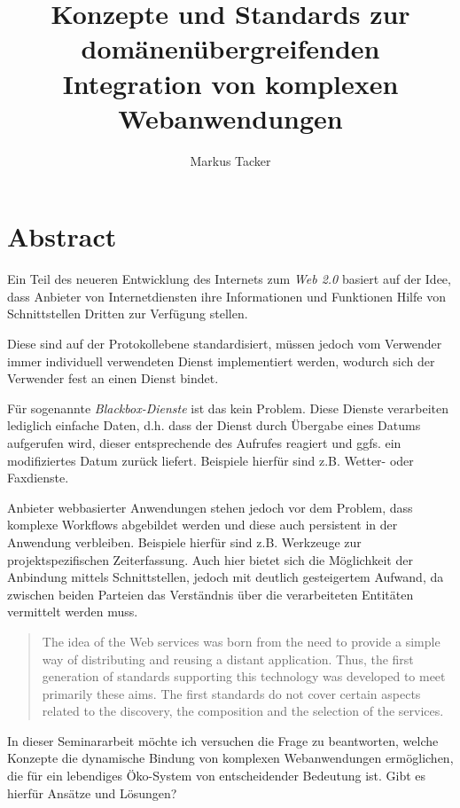 \documentclass[12pt,a4paper]{article}
\begin{document}
\author{Markus Tacker}
\title{Konzepte und Standards zur domänenübergreifenden Integration von komplexen Webanwendungen}
\maketitle
\section*{Abstract}
Ein Teil des neueren Entwicklung des Internets zum \emph{Web 2.0} basiert auf der Idee, dass Anbieter von Internetdiensten ihre Informationen und Funktionen Hilfe von Schnittstellen Dritten zur Verfügung stellen.\cite{baresitalk2007}

Diese sind auf der Protokollebene standardisiert, müssen jedoch vom Verwender immer individuell verwendeten Dienst implementiert werden, wodurch sich der Verwender fest an einen Dienst bindet.

Für sogenannte \emph{Blackbox-Dienste} ist das kein Problem. Diese Dienste verarbeiten lediglich einfache Daten, d.h. dass der Dienst durch Übergabe eines Datums aufgerufen wird, dieser entsprechende des Aufrufes reagiert und ggfs. ein modifiziertes Datum zurück liefert. Beispiele hierfür sind z.B. Wetter- oder Faxdienste. 

Anbieter webbasierter Anwendungen stehen jedoch vor dem Problem, dass komplexe Workflows abgebildet werden und diese auch persistent in der Anwendung verbleiben. Beispiele hierfür sind z.B. Werkzeuge zur projektspezifischen Zeiterfassung. Auch hier bietet sich die Möglichkeit der Anbindung mittels Schnittstellen, jedoch mit deutlich gesteigertem Aufwand, da zwischen beiden Parteien das Verständnis über die verarbeiteten Entitäten vermittelt werden muss. 

\begin{quote}
The idea of the Web services was born from the need to
provide a simple way of distributing and reusing a distant
application. Thus, the first generation of standards supporting
this technology was developed to meet primarily these aims.
The first standards do not cover certain aspects related to the
discovery, the composition and the selection of the services.\cite{ei-sawsdl}
\end{quote}

In dieser Seminararbeit möchte ich versuchen die Frage zu beantworten, welche Konzepte die dynamische Bindung von komplexen Webanwendungen ermöglichen, die für ein lebendiges Öko-System von entscheidender Bedeutung ist. Gibt es hierfür Ansätze und Lösungen?
\end{document}
